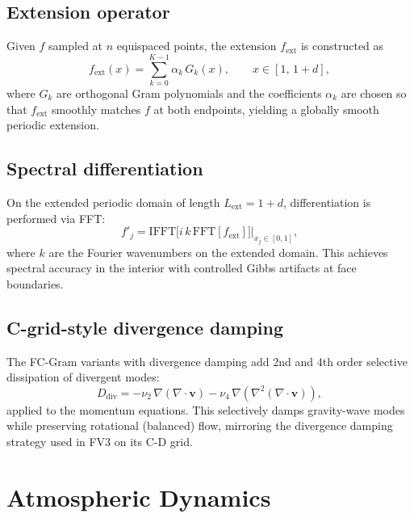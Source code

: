 \documentclass[11pt,a4paper]{article}
\begin{document}
\subsection{Extension operator}
Given $f$ sampled at $n$ equispaced points, the extension $f_{\mathrm{ext}}$ is constructed as
\begin{equation}
  f_{\mathrm{ext}}(x) = \sum_{k=0}^{K-1}\alpha_k\,G_k(x), \qquad x\in[1,\,1+d],
\end{equation}
where $G_k$ are orthogonal Gram polynomials and the coefficients $\alpha_k$ are chosen so that $f_{\mathrm{ext}}$ smoothly matches $f$ at both endpoints, yielding a globally smooth periodic extension.

\subsection{Spectral differentiation}
On the extended periodic domain of length $L_{\mathrm{ext}}=1+d$, differentiation is performed via FFT:
\begin{equation}
  f'_j = \mathrm{IFFT}\bigl[i\,k\,\mathrm{FFT}[f_{\mathrm{ext}}]\bigr]\bigg|_{x_j\in[0,1]},
\end{equation}
where $k$ are the Fourier wavenumbers on the extended domain.  This achieves spectral accuracy in the interior with controlled Gibbs artifacts at face boundaries.

\subsection{C-grid-style divergence damping}
The FC-Gram variants with divergence damping add 2nd and 4th order selective dissipation of divergent modes:
\begin{equation}
  D_{\mathrm{div}} = -\nu_2\,\nabla(\nabla\!\cdot\!\bm v) - \nu_4\,\nabla(\nabla^2(\nabla\!\cdot\!\bm v)),
\end{equation}
applied to the momentum equations.  This selectively damps gravity-wave modes while preserving rotational (balanced) flow, mirroring the divergence damping strategy used in FV3 on its C-D grid.

\section{Atmospheric Dynamics}

\end{document}
